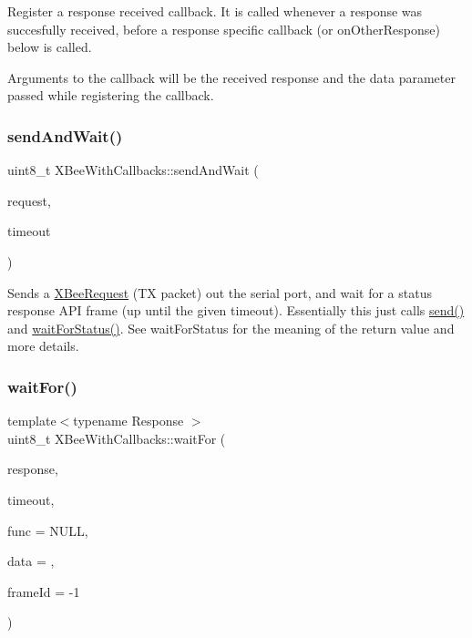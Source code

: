 Register a response received callback. It is called whenever a response was succesfully received, before a response specific callback (or on\+Other\+Response) below is called.

Arguments to the callback will be the received response and the data parameter passed while registering the callback. \hypertarget{class_x_bee_with_callbacks_ab503dbf4de2376d68564ffff9a11d0c5}{}\label{class_x_bee_with_callbacks_ab503dbf4de2376d68564ffff9a11d0c5} 
\subsubsection{\texorpdfstring{send\+And\+Wait()}{sendAndWait()}}
{\footnotesize\ttfamily uint8\+\_\+t X\+Bee\+With\+Callbacks\+::send\+And\+Wait (\begin{DoxyParamCaption}\item[{\hyperlink{class_x_bee_request}{X\+Bee\+Request} \&}]{request,  }\item[{uint16\+\_\+t}]{timeout }\end{DoxyParamCaption})\hspace{0.3cm}{\ttfamily [inline]}}

Sends a \hyperlink{class_x_bee_request}{X\+Bee\+Request} (TX packet) out the serial port, and wait for a status response A\+PI frame (up until the given timeout). Essentially this just calls \hyperlink{class_x_bee_a802387f468be8622941d16739ac848f2}{send()} and \hyperlink{class_x_bee_with_callbacks_acc987ba525278080c3cbe2db1d2ed249}{wait\+For\+Status()}. See wait\+For\+Status for the meaning of the return value and more details. \hypertarget{class_x_bee_with_callbacks_aca6a7f82b94c3d2dc4353c0a18404da7}{}\label{class_x_bee_with_callbacks_aca6a7f82b94c3d2dc4353c0a18404da7} 
\subsubsection{\texorpdfstring{wait\+For()}{waitFor()}}
{\footnotesize\ttfamily template$<$typename Response $>$ \\
uint8\+\_\+t X\+Bee\+With\+Callbacks\+::wait\+For (\begin{DoxyParamCaption}\item[{Response \&}]{response,  }\item[{uint16\+\_\+t}]{timeout,  }\item[{bool($\ast$)(Response \&, uintptr\+\_\+t)}]{func = {\ttfamily NULL},  }\item[{uintptr\+\_\+t}]{data = {},  }\item[{int16\+\_\+t}]{frame\+Id = {\ttfamily -\/1} }\end{DoxyParamCaption})\hspace{0.3cm}{\ttfamily [inline]}}

